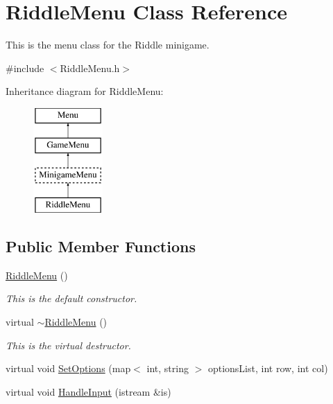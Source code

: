 \hypertarget{classRiddleMenu}{\section{Riddle\-Menu Class Reference}
\label{classRiddleMenu}
}


This is the menu class for the Riddle minigame.  




{\ttfamily \#include $<$Riddle\-Menu.\-h$>$}

Inheritance diagram for Riddle\-Menu\-:\begin{figure}[H]
\begin{center}
\leavevmode
\includegraphics[height=4.000000cm]{classRiddleMenu}
\end{center}
\end{figure}
\subsection*{Public Member Functions}
\begin{DoxyCompactItemize}
\item 
\hypertarget{classRiddleMenu_a68e4be3bbc49bdb2f3d8a9fda74614d9}{\hyperlink{classRiddleMenu_a68e4be3bbc49bdb2f3d8a9fda74614d9}{Riddle\-Menu} ()}\label{classRiddleMenu_a68e4be3bbc49bdb2f3d8a9fda74614d9}

\begin{DoxyCompactList}\small\item\em This is the default constructor. \end{DoxyCompactList}\item 
\hypertarget{classRiddleMenu_a9366deb179c1145947e37d599216d64e}{virtual \hyperlink{classRiddleMenu_a9366deb179c1145947e37d599216d64e}{$\sim$\-Riddle\-Menu} ()}\label{classRiddleMenu_a9366deb179c1145947e37d599216d64e}

\begin{DoxyCompactList}\small\item\em This is the virtual destructor. \end{DoxyCompactList}\item 
virtual void \hyperlink{classRiddleMenu_aeef176b2f0b886cd7b0325fc0dc1c6a4}{Set\-Options} (map$<$ int, string $>$ options\-List, int row, int col)
\item 
virtual void \hyperlink{classRiddleMenu_aef67f984c1aad0b8240e03b43ccbe615}{Handle\-Input} (istream \&is)
\end{DoxyCompactItemize}
